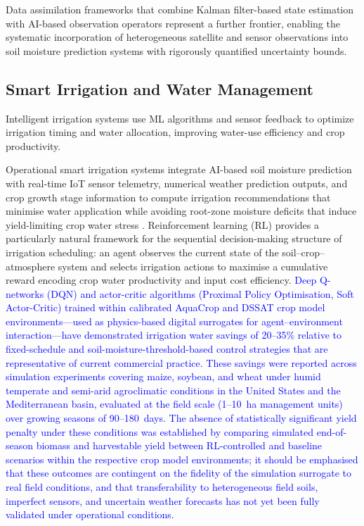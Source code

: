 \documentclass[land,article,submit,pdftex,moreauthors]{Definitions/mdpi}
\numberwithin{equation}{section}
\begin{document}
Data assimilation frameworks that combine Kalman filter-based state estimation with AI-based observation operators represent a further frontier, enabling the systematic incorporation of heterogeneous satellite and sensor observations into soil moisture prediction systems with rigorously quantified uncertainty bounds.

\subsection{Smart Irrigation and Water Management}

Intelligent irrigation systems use ML algorithms and sensor feedback to optimize irrigation timing and water allocation, improving water-use efficiency and crop productivity.

Operational smart irrigation systems integrate AI-based soil moisture prediction with real-time IoT sensor telemetry, numerical weather prediction outputs, and crop growth stage information to compute irrigation recommendations that minimise water application while avoiding root-zone moisture deficits that induce yield-limiting crop water stress \citep{vij2020iot}. Reinforcement learning (RL) provides a particularly natural framework for the sequential decision-making structure of irrigation scheduling: an agent observes the current state of the soil--crop--atmosphere system and selects irrigation actions to maximise a cumulative reward encoding crop water productivity and input cost efficiency. \textcolor{blue}{Deep Q-networks (DQN) and actor-critic algorithms (Proximal Policy Optimisation, Soft Actor-Critic) trained within calibrated AquaCrop and DSSAT crop model environments---used as physics-based digital surrogates for agent--environment interaction---have demonstrated irrigation water savings of 20--35\% relative to fixed-schedule and soil-moisture-threshold-based control strategies that are representative of current commercial practice. These savings were reported across simulation experiments covering maize, soybean, and wheat under humid temperate and semi-arid agroclimatic conditions in the United States and the Mediterranean basin, evaluated at the field scale (1--10~ha management units) over growing seasons of 90--180~days. The absence of statistically significant yield penalty under these conditions was established by comparing simulated end-of-season biomass and harvestable yield between RL-controlled and baseline scenarios within the respective crop model environments; it should be emphasised that these outcomes are contingent on the fidelity of the simulation surrogate to real field conditions, and that transferability to heterogeneous field soils, imperfect sensors, and uncertain weather forecasts has not yet been fully validated under operational conditions.}
\end{document}
